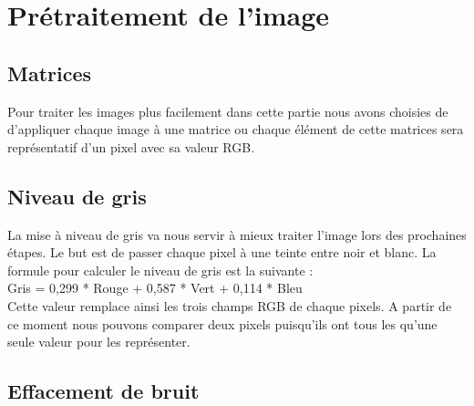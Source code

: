 \documentclass [french,12pt]{article}
\begin{document}
\section{Prétraitement de l'image}

\subsection{Matrices}

Pour traiter les images plus facilement dans cette partie nous avons choisies de d’appliquer chaque image à une matrice ou chaque élément de cette matrices sera représentatif d’un pixel avec sa valeur RGB.

\subsection{Niveau de gris}

La mise à niveau de gris va nous servir à mieux traiter l’image lors des prochaines étapes. Le but est de passer chaque pixel à une teinte entre noir et blanc.  La formule pour calculer le niveau de gris est la suivante :
	\\Gris = 0,299 * Rouge + 0,587 * Vert + 0,114 * Bleu
	\\Cette valeur remplace ainsi les trois champs RGB de chaque pixels. A partir de ce moment nous pouvons comparer deux pixels puisqu’ils ont tous les qu’une seule valeur pour les représenter.

\subsection{Effacement de bruit}
\end{document}
